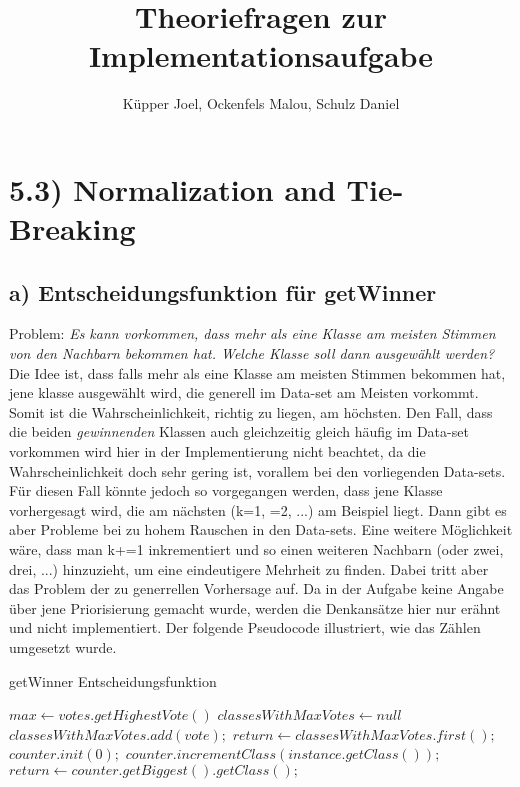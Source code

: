 \documentclass[11pt, oneside]{article}
\title{Theoriefragen zur Implementationsaufgabe}
\author{K\"upper Joel,
Ockenfels Malou,
Schulz Daniel}
\begin{document}
\maketitle

\section{5.3) Normalization and Tie-Breaking}
\subsection{a) Entscheidungsfunktion für getWinner}
Problem: \textit{Es kann vorkommen, dass mehr als eine Klasse am meisten Stimmen von den Nachbarn bekommen hat. Welche Klasse soll dann ausgewählt werden?}\newline
Die Idee ist, dass falls mehr als eine Klasse am meisten Stimmen bekommen hat, jene klasse ausgewählt wird, die generell im Data-set am Meisten vorkommt. 
Somit ist die Wahrscheinlichkeit, richtig zu liegen, am höchsten.
Den Fall, dass die beiden \emph{gewinnenden} Klassen auch gleichzeitig gleich häufig im Data-set vorkommen wird hier in der Implementierung nicht beachtet, da die Wahrscheinlichkeit doch sehr gering ist, vorallem bei den vorliegenden Data-sets.\newline
Für diesen Fall könnte jedoch so vorgegangen werden, dass jene Klasse vorhergesagt wird, die am nächsten (k=1, =2, ...) am Beispiel liegt.
Dann gibt es aber Probleme bei zu hohem Rauschen in den Data-sets.\newline
Eine weitere Möglichkeit wäre, dass man k+=1 inkrementiert und so einen weiteren Nachbarn (oder zwei, drei, ...) hinzuzieht, um eine eindeutigere Mehrheit zu finden. 
Dabei tritt aber das Problem der zu generrellen Vorhersage auf. 
Da in der Aufgabe keine Angabe über jene Priorisierung gemacht wurde, werden die Denkansätze hier nur erähnt und nicht implementiert.\newline
Der folgende Pseudocode illustriert, wie das Zählen umgesetzt wurde.

\begin{algorithm}[H]
\caption{getWinner Entscheidungsfunktion}\label{euclid}
\begin{algorithmic}[1]
\State $max \gets votes.getHighestVote()$
\State $classesWithMaxVotes \gets null$
	\State $classesWithMaxVotes.add(vote);$
\EndIf
\EndFor
{}
	\State $return \gets classesWithMaxVotes.first();$
\Else
	\State $counter.init(0);$
			\State $counter.incrementClass(instance.getClass());$
		\EndIf
	\EndFor
\EndIf
\State $return \gets counter.getBiggest().getClass();$

\EndFunction
\end{algorithmic}
\end{algorithm}
\pagebreak
\end{document}
